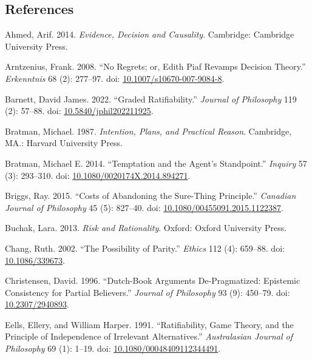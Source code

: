 \documentclass[
  10pt,
  letterpaper,
  DIV=11,
  numbers=noendperiod,
  twoside]{scrartcl}
\newlength{\cslhangindent}
\newenvironment{CSLReferences}[2] %
 {\begin{list}{}{%
  \setlength{\itemindent}{0pt}
  \setlength{\leftmargin}{0pt}
  \setlength{\parsep}{0pt}
  \ifodd #1
   \setlength{\leftmargin}{\cslhangindent}
   \setlength{\itemindent}{-1\cslhangindent}
  \fi
  \setlength{\itemsep}{#2\baselineskip}}}
 {\end{list}}
\begin{document}
\subsection*{References}\label{references}

\label{refs}
\begin{CSLReferences}{1}{0}
Ahmed, Arif. 2014. \emph{Evidence, Decision and Causality}. Cambridge:
{C}ambridge {U}niversity {P}ress.

Arntzenius, Frank. 2008. {``No Regrets; or, Edith Piaf Revamps Decision
Theory.''} \emph{Erkenntnis} 68 (2): 277--97. doi:
\href{https://doi.org/10.1007/s10670-007-9084-8}{10.1007/s10670-007-9084-8}.

Barnett, David James. 2022. {``Graded Ratifiability.''} \emph{Journal of
Philosophy} 119 (2): 57--88. doi:
\href{https://doi.org/10.5840/jphil202211925}{10.5840/jphil202211925}.

Bratman, Michael. 1987. \emph{Intention, Plans, and Practical Reason}.
Cambridge, MA.: Harvard University Press.

Bratman, Michael E. 2014. {``Temptation and the Agent's Standpoint.''}
\emph{Inquiry} 57 (3): 293--310. doi:
\href{https://doi.org/10.1080/0020174X.2014.894271}{10.1080/0020174X.2014.894271}.

Briggs, Ray. 2015. {``Costs of Abandoning the Sure-Thing Principle.''}
\emph{Canadian Journal of Philosophy} 45 (5): 827--40. doi:
\href{https://doi.org/10.1080/00455091.2015.1122387}{10.1080/00455091.2015.1122387}.

Buchak, Lara. 2013. \emph{Risk and Rationality}. Oxford: Oxford
University Press.

Chang, Ruth. 2002. {``The Possibility of Parity.''} \emph{Ethics} 112
(4): 659--88. doi:
\href{https://doi.org/10.1086/339673}{10.1086/339673}.

Christensen, David. 1996. {``Dutch-Book Arguments {D}e-Pragmatized:
Epistemic Consistency for Partial Believers.''} \emph{Journal of
Philosophy} 93 (9): 450--79. doi:
\href{https://doi.org/10.2307/2940893}{10.2307/2940893}.

Eells, Ellery, and William Harper. 1991. {``Ratifiability, Game Theory,
and the Principle of Independence of Irrelevant Alternatives.''}
\emph{Australasian Journal of Philosophy} 69 (1): 1--19. doi:
\href{https://doi.org/10.1080/00048409112344491}{10.1080/00048409112344491}.


\end{CSLReferences}
\end{document}
